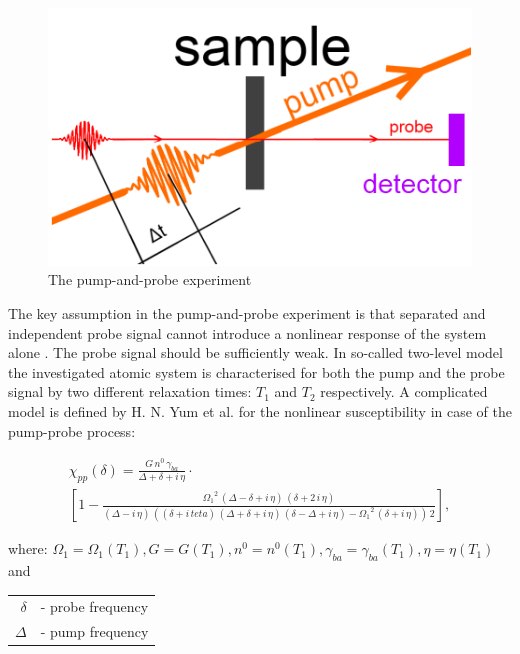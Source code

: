 \documentclass[12pt,twoside,a4paper]{article}
\numberwithin{equation}{subsection}
\numberwithin{figure}{subsection}
\begin{document}
\begin{figure} 
  \includegraphics{img/pnp.png}
  \caption{The pump-and-probe experiment\label{fig:pump_and_probe}}
\end{figure}


The key assumption in the pump-and-probe experiment is that separated and independent probe signal cannot introduce a nonlinear
response of the system alone \cite{boyd_nlo}. The probe signal should be sufficiently weak. In so-called two-level model the
investigated atomic system is characterised for both the pump and the probe signal by two different relaxation times: ${T_{1}}$ 
and ${T_{2}}$ respectively. A complicated model is defined by H. N. Yum et al. \cite{yum_pump} for the nonlinear susceptibility in
case of the pump-probe process:

\begin{multline}   \label{eq:pump_equation}
     {\chi_{pp}}(\delta ) = \frac {G\,n^{0}\,{\gamma_{ba}}}{\Delta  + \delta  + i\,\eta } \cdot \\
     [1 - \frac {{\Omega_{1}}^{2}\,(\Delta  - \delta  + i\,\eta )\,(\delta  + 2\,i\,\eta )}{(\Delta  - i\,\eta )\,((\delta  + i\,
     teta)\,(\Delta  + \delta  + i\,\eta )\,(\delta  - \Delta  + i\,\eta ) - {\Omega_{1}}^{2}\,(\delta  + i\,\eta ))\,2}],
\end{multline}

where: ${\Omega_{1}} = \Omega_{1} ({T_{1}}), G = G({T_{1}}), n^{0} = n^{0}({T_{1}}), \gamma_{ba} = \gamma_{{ba}}({T_{1}}), \eta =
\eta ({T_{1}})$ and 

\begin{tabular} {r l}
  $\delta $ & - probe frequency \\
  $\Delta $ & - pump frequency \\
\end{tabular}
\end{document}
